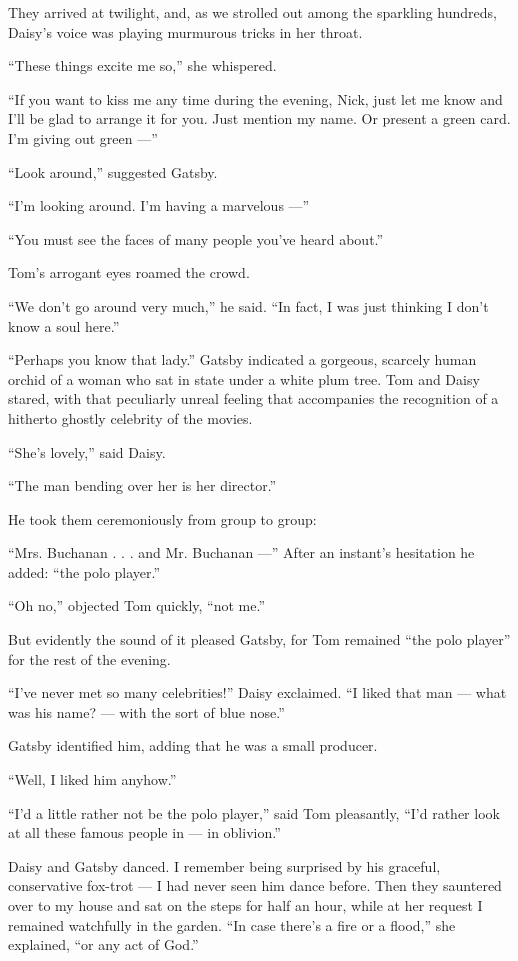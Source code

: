 \documentclass{znotebook}
\begin{document}
They arrived at twilight, and, as we strolled out among the sparkling hundreds, Daisy's voice was playing murmurous tricks in her throat.

``These things excite me so,'' she whispered.

``If you want to kiss me any time during the evening, Nick, just let me know and I'll be glad to arrange it for you. Just mention my name. Or present a green card. I'm giving out green ---''

``Look around,'' suggested Gatsby.

``I'm looking around. I'm having a marvelous ---''

``You must see the faces of many people you've heard about.''

Tom's arrogant eyes roamed the crowd.

``We don't go around very much,'' he said. ``In fact, I was just thinking I don't know a soul here.''

``Perhaps you know that lady.'' Gatsby indicated a gorgeous, scarcely human orchid of a woman who sat in state under a white plum tree. Tom and Daisy stared, with that peculiarly unreal feeling that accompanies the recognition of a hitherto ghostly celebrity of the movies.

``She's lovely,'' said Daisy.

``The man bending over her is her director.''

He took them ceremoniously from group to group:

``Mrs. Buchanan . . . and Mr. Buchanan ---'' After an instant's hesitation he added: ``the polo player.''

``Oh no,'' objected Tom quickly, ``not me.''

But evidently the sound of it pleased Gatsby, for Tom remained ``the polo player'' for the rest of the evening.

``I've never met so many celebrities!'' Daisy exclaimed. ``I liked that man ---{} what was his name? ---{} with the sort of blue nose.''

Gatsby identified him, adding that he was a small producer.

``Well, I liked him anyhow.''

``I'd a little rather not be the polo player,'' said Tom pleasantly, ``I'd rather look at all these famous people in ---{} in oblivion.''

Daisy and Gatsby danced. I remember being surprised by his graceful, conservative fox-trot ---{} I had never seen him dance before. Then they sauntered over to my house and sat on the steps for half an hour, while at her request I remained watchfully in the garden. ``In case there's a fire or a flood,'' she explained, ``or any act of God.''
\end{document}
